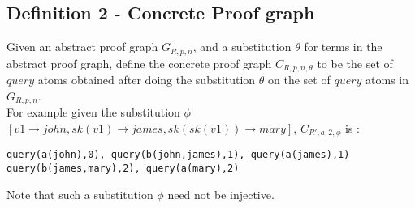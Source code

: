 \documentclass{article}
\begin{document}
\subsection{Definition 2 - Concrete Proof graph}
Given an abstract proof graph $G_{R,p,n}$, and a substitution $\theta$ for terms in the abstract proof graph, define the concrete proof graph $C_{R,p,n,\theta}$ to be the set of $query$ atoms obtained after doing the substitution $\theta$ on the set of $query$ atoms in $G_{R,p,n}$. \\
\newline
For example given the substitution $\phi$ $[v1\rightarrow john, sk(v1) \rightarrow james, sk(sk(v1))\rightarrow mary]$, $C_{R',a,2,\phi}$ is : \begin{verbatim}
query(a(john),0), query(b(john,james),1), query(a(james),1)
query(b(james,mary),2), query(a(mary),2) \end{verbatim}
Note that such a substitution $\phi$ need not be injective.
\end{document}
